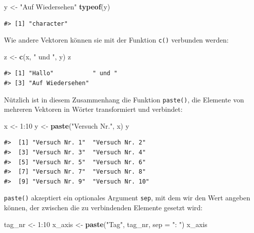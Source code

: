 \documentclass[]{tufte-book}
\newenvironment{Shaded}{}{}
\newcommand{\KeywordTok}[1]{\textcolor[rgb]{0.00,0.44,0.13}{\textbf{#1}}}
\newcommand{\DataTypeTok}[1]{\textcolor[rgb]{0.56,0.13,0.00}{#1}}
\newcommand{\DecValTok}[1]{\textcolor[rgb]{0.25,0.63,0.44}{#1}}
\newcommand{\StringTok}[1]{\textcolor[rgb]{0.25,0.44,0.63}{#1}}
\newcommand{\OperatorTok}[1]{\textcolor[rgb]{0.40,0.40,0.40}{#1}}
\newcommand{\NormalTok}[1]{#1}
\begin{document}
\begin{Shaded}
\begin{Highlighting}[]
\NormalTok{y <-}\StringTok{ "Auf Wiedersehen"}
\KeywordTok{typeof}\NormalTok{(y)}
\end{Highlighting}
\end{Shaded}

\begin{verbatim}
#> [1] "character"
\end{verbatim}

Wie andere Vektoren können sie mit der Funktion \texttt{c()} verbunden
werden:

\begin{Shaded}
\begin{Highlighting}[]
\NormalTok{z <-}\StringTok{ }\KeywordTok{c}\NormalTok{(x, }\StringTok{" und "}\NormalTok{, y)}
\NormalTok{z}
\end{Highlighting}
\end{Shaded}

\begin{verbatim}
#> [1] "Hallo"           " und "          
#> [3] "Auf Wiedersehen"
\end{verbatim}

Nützlich ist in diesem Zusammenhang die Funktion \texttt{paste()}, die
Elemente von mehreren Vektoren in Wörter transformiert und verbindet:

\begin{Shaded}
\begin{Highlighting}[]
\NormalTok{x <-}\StringTok{ }\DecValTok{1}\OperatorTok{:}\DecValTok{10}
\NormalTok{y <-}\StringTok{ }\KeywordTok{paste}\NormalTok{(}\StringTok{"Versuch Nr."}\NormalTok{, x)}
\NormalTok{y}
\end{Highlighting}
\end{Shaded}

\begin{verbatim}
#>  [1] "Versuch Nr. 1"  "Versuch Nr. 2" 
#>  [3] "Versuch Nr. 3"  "Versuch Nr. 4" 
#>  [5] "Versuch Nr. 5"  "Versuch Nr. 6" 
#>  [7] "Versuch Nr. 7"  "Versuch Nr. 8" 
#>  [9] "Versuch Nr. 9"  "Versuch Nr. 10"
\end{verbatim}

\texttt{paste()} akzeptiert ein optionales Argument \texttt{sep}, mit
dem wir den Wert angeben können, der zwischen die zu verbindenden
Elemente gesetzt wird:

\begin{Shaded}
\begin{Highlighting}[]
\NormalTok{tag_nr <-}\StringTok{ }\DecValTok{1}\OperatorTok{:}\DecValTok{10}
\NormalTok{x_axis <-}\StringTok{ }\KeywordTok{paste}\NormalTok{(}\StringTok{"Tag"}\NormalTok{, tag_nr, }\DataTypeTok{sep =} \StringTok{": "}\NormalTok{)}
\NormalTok{x_axis}
\end{Highlighting}
\end{Shaded}
\end{document}

